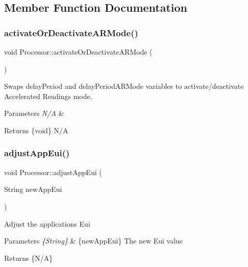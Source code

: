 \subsection{Member Function Documentation}
\mbox{\label{class_processor_a9316beb5903476939018dce45e992c53}} 
\subsubsection{\texorpdfstring{activate\+Or\+Deactivate\+A\+R\+Mode()}{activateOrDeactivateARMode()}}
{\footnotesize\ttfamily void Processor\+::activate\+Or\+Deactivate\+A\+R\+Mode (\begin{DoxyParamCaption}{ }\end{DoxyParamCaption})}

Swaps delay\+Period and delay\+Period\+A\+R\+Mode variables to activate/deactivate Accelerated Readings mode. 
\begin{DoxyParams}{Parameters}
{\em N/A} & \\
\hline
\end{DoxyParams}
\begin{DoxyReturn}{Returns}
\{void\} N/A 
\end{DoxyReturn}
\mbox{\label{class_processor_a9e5c642ce356b8aebe5998158f31ded5}} 
\subsubsection{\texorpdfstring{adjust\+App\+Eui()}{adjustAppEui()}}
{\footnotesize\ttfamily void Processor\+::adjust\+App\+Eui (\begin{DoxyParamCaption}\item[{String}]{new\+App\+Eui }\end{DoxyParamCaption})}

Adjust the application\textquotesingle{}s Eui 
\begin{DoxyParams}{Parameters}
{\em \{\+String\}} & \{new\+App\+Eui\} The new Eui value \\
\hline
\end{DoxyParams}
\begin{DoxyReturn}{Returns}
\{N/A\} 
\end{DoxyReturn}
\mbox{\label{class_processor_adee07912124face3700bc988606b8f38}} 
